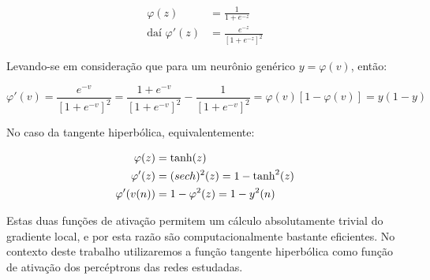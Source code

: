 \begin{align}
\varphi(z) &= \frac{1}{1 + e^{-z}} \\
\text{daí } \varphi'(z) &= \frac{e^{-z}}{[1+e^{-z}]^2}
\end{align}

Levando-se em consideração que para um neurônio genérico $y =
\varphi(v)$, então:

\begin{equation}
\varphi'(v) = \frac{e^{-v}}{[1+e^{-v}]^2} = \frac{1+e^{-v}}{[1+e^{-v}]^2} -
\frac{1}{[1+e^{-v}]^2} = \varphi(v)[1 - \varphi(v)] = y(1-y)
\end{equation}

No caso da tangente hiperbólica, equivalentemente:

\begin{align}
\varphi(z) &= \tanh(z) \\
\varphi'(z) &= \text(sech)^2(z) = 1 - \tanh^2(z) \\
\varphi'(v(n)) &= 1 - \varphi^2(z) = 1-y^2(n)
\end{align}

Estas duas funções de ativação permitem um cálculo absolutamente trivial do
gradiente local, e por esta razão são computacionalmente bastante
eficientes. No contexto deste trabalho utilizaremos a função tangente
hiperbólica como função de ativação dos percéptrons das redes estudadas.

